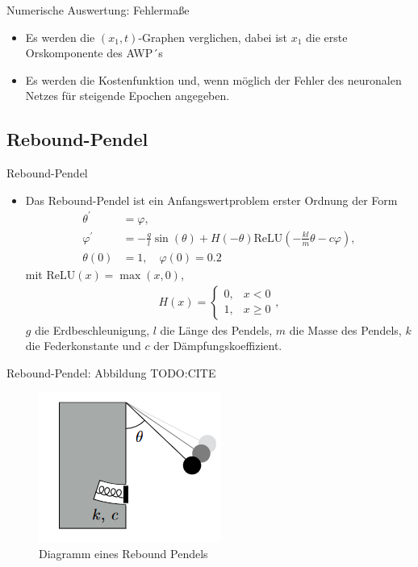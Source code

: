 \begin{frame}{Numerische Auswertung: Fehlermaße}
    \begin{itemize}
        \item<1-> Es werden die $(x_1,t)$-Graphen verglichen, dabei ist $x_1$ die erste Orskomponente des AWP´s
        \item<2-> Es werden die Kostenfunktion und, wenn möglich der Fehler des neuronalen Netzes für steigende Epochen
        angegeben.
    \end{itemize}
\end{frame}

\subsection{Rebound-Pendel}

\begin{frame}{Rebound-Pendel}
    \begin{itemize}
        \item<1-> Das Rebound-Pendel ist ein Anfangswertproblem erster Ordnung der Form
        \begin{align}
            \theta^{\prime} &= \varphi, \nonumber \\
            \varphi^{\prime} &= - \frac{g}{l} \sin(\theta) + H(-\theta)
            \text{ReLU}(-\frac{kl}{m}\theta - c \varphi), \label{rebound-pendulum}\\
            \theta(0) &= 1, \quad \varphi(0)=0.2 \nonumber
        \end{align}
        mit $\text{ReLU}(x)= \max(x, 0)$,
        \begin{align*}
            H(x) =
            \begin{cases}
                0, &x<0 \\
                1, &x \geq 0
            \end{cases},
        \end{align*}
        $g$ die Erdbeschleunigung, $l$ die Länge des Pendels, $m$ die Masse des Pendels, $k$ die Federkonstante und $c$ der
        Dämpfungskoeffizient.
    \end{itemize}
\end{frame}

\begin{frame}{Rebound-Pendel: Abbildung}
    TODO:CITE
    \begin{figure}
        \centering
        \includegraphics{images/rebound_pendulum_diagram}
        \caption{Diagramm eines Rebound Pendels\cite[6]{flamantSolvingDifferentialEquations2020}}
        \label{fig:rebound_pendulum_diagram}
    \end{figure}
\end{frame}

